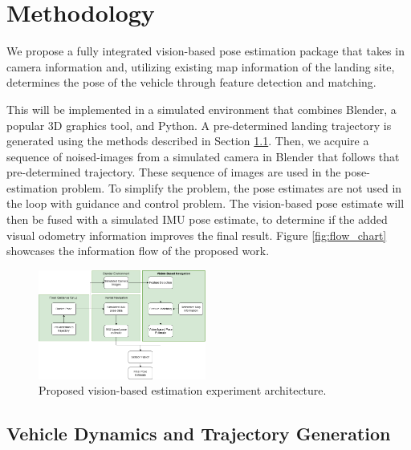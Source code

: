 \documentclass[conference]{IEEEtran}
\begin{document}
\section{Methodology}

We propose a fully integrated vision-based pose estimation package that takes in camera information and, utilizing existing map information of the landing site, determines the pose of the vehicle through feature detection and matching.

This will be implemented in a simulated environment that combines Blender, a popular 3D graphics tool, and Python. A pre-determined landing trajectory is generated using the methods described in Section \ref{sec:dynamics}. Then, we acquire a sequence of noised-images from a simulated camera in Blender that follows that pre-determined trajectory. These sequence of images are used in the pose-estimation problem. To simplify the problem, the pose estimates are not used in the loop with guidance and control problem. The vision-based pose estimate will then be fused with a simulated IMU pose estimate, to determine if the added visual odometry information improves the final result. Figure \ref{fig:flow_chart} showcases the information flow of the proposed work.

\begin{figure}[htbp] \label{fig:flow_chart}
    \centerline{\includegraphics[width=0.49\textwidth]{273_project_flow.png}}
    \caption{Proposed vision-based estimation experiment architecture.}
    \label{fig:sys_arch}
\end{figure}

\subsection{Vehicle Dynamics and Trajectory Generation} \label{sec:dynamics}
\end{document}
